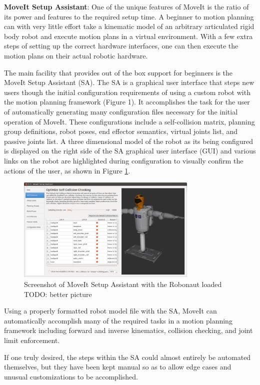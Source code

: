 \documentclass[10pt,journal,compsoc]{joser1}
\begin{document}
{{\bf MoveIt Setup Assistant}: One of the unique features of MoveIt is the ratio of its power and features to the required setup time. A beginner to motion planning can with very little effort take a kinematic model of an arbitrary articulated rigid body robot and execute motion plans in a virtual environment. With a few extra steps of setting up the correct hardware interfaces, one can then execute the motion plans on their actual robotic hardware.

The main facility that provides out of the box support for beginners is the MoveIt Setup Assistant (SA). The SA is a graphical user interface that steps new users though the initial configuration requirements of using a custom robot with the motion planning framework (Figure 1). It accomplishes the task for the user of automatically generating many configuration files necessary for the initial operation of MoveIt. These configurations include a self-collision matrix, planning group definitions, robot poses, end effector semantics, virtual joints list, and passive joints list. A three dimensional model of the robot as its being configured is displayed on the right side of the SA graphical user interface (GUI) and various links on the robot are highlighted during configuration to visually confirm the actions of the user, as shown in Figure \ref{fig:setupassistant}.

\begin{figure}[!t]
\centering
\includegraphics[width=3.4in]{images/setup_assistant}
\caption{Screenshot of MoveIt Setup Assistant with the Robonaut loaded TODO: better picture}
\label{fig:setupassistant}
\end{figure}

Using a properly formatted robot model file with the SA, MoveIt can automatically accomplish many of the required tasks in a motion planning framework including forward and inverse kinematics, collision checking, and joint limit enforcement.

If one truly desired, the steps within the SA could almost entirely be automated themselves, but they have been kept manual so as to allow edge cases and unusual customizations to be accomplished.

}
\end{document}
